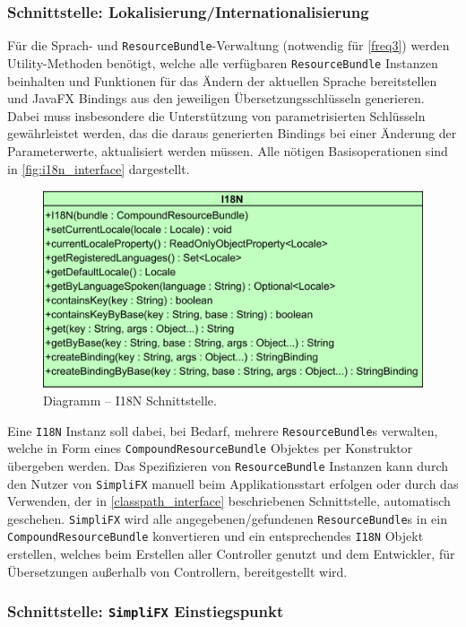 \subsubsection{Schnittstelle: Lokalisierung/Internationalisierung}
Für die Sprach- und \texttt{ResourceBundle}-Verwaltung (notwendig für \autoref{freq3}) werden Utility-Methoden benötigt, welche alle verfügbaren \texttt{ResourceBundle} Instanzen beinhalten und Funktionen für das Ändern der aktuellen Sprache bereitstellen und JavaFX Bindings aus den jeweiligen Übersetzungsschlüsseln generieren. Dabei muss insbesondere die Unterstützung von parametrisierten Schlüsseln gewährleistet werden, das die daraus generierten Bindings bei einer Änderung der Parameterwerte, aktualisiert werden müssen. Alle nötigen Basisoperationen sind in \autoref{fig:i18n_interface} dargestellt.
\begin{figure}[H]
	\centering
	\includegraphics[width=\textwidth-2cm]{Abbildungen/I18N.png}
	\caption{Diagramm -- I18N Schnittstelle.}
	\label{fig:i18n_interface}
\end{figure}
\noindent Eine \texttt{I18N} Instanz soll dabei, bei Bedarf, mehrere \texttt{ResourceBundle}s verwalten, welche in Form eines \texttt{CompoundResourceBundle} Objektes per Konstruktor übergeben werden. Das Spezifizieren von \texttt{ResourceBundle} Instanzen kann durch den Nutzer von \texttt{SimpliFX} manuell beim Applikationsstart erfolgen oder durch das Verwenden, der in \autoref{classpath_interface} beschriebenen Schnittstelle, automatisch geschehen. \texttt{SimpliFX} wird alle angegebenen/gefundenen \texttt{ResourceBundle}s in ein \texttt{CompoundResourceBundle} konvertieren und ein entsprechendes \texttt{I18N} Objekt erstellen, welches beim Erstellen aller Controller genutzt und dem Entwickler, für Übersetzungen außerhalb von Controllern, bereitgestellt wird.
\subsubsection{Schnittstelle: \texttt{SimpliFX} Einstiegspunkt}
